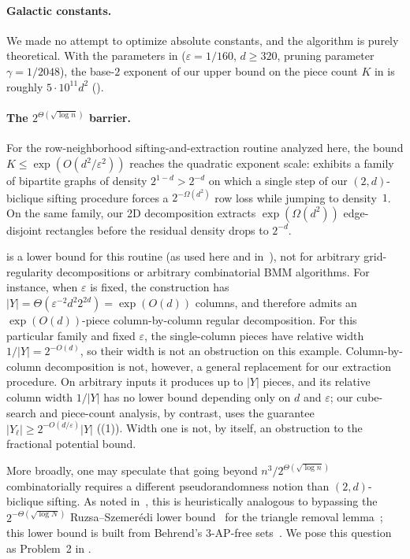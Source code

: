 \documentclass[11pt]{article}
\theoremstyle{definition}
\newcommand{\abs}[1]{\left\lvert #1 \right\rvert}
\begin{document}
\paragraph{Galactic constants.}
We made no attempt to optimize absolute constants, and the algorithm is purely theoretical. With the parameters in  ($\varepsilon = 1/160$, $d \ge 320$, pruning parameter $\gamma = 1/2048$), the base-$2$ exponent of our upper bound on the piece count $K$ in  is roughly $5 \cdot 10^{11} d^2$ ().

\paragraph{The $2^{\Theta(\sqrt{\log n})}$ barrier.}
For the row-neighborhood sifting-and-extraction routine analyzed here, the bound $K \le \exp(O(d^2 / \varepsilon^2))$ reaches the quadratic exponent scale:  exhibits a family of bipartite graphs of density $2^{1-d} > 2^{-d}$ on which a single step of our $(2, d)$-biclique sifting procedure forces a $2^{-\Omega(d^2)}$ row loss while jumping to density~$1$. On the same family, our 2D decomposition extracts $\exp(\Omega(d^2))$ edge-disjoint rectangles before the residual density drops to $2^{-d}$.

 is a lower bound for this routine (as used here and in~\cite{AFKLM24}), not for arbitrary grid-regularity decompositions or arbitrary combinatorial BMM algorithms. For instance, when $\varepsilon$ is fixed, the construction has $\abs{Y} = \Theta(\varepsilon^{-2} d^2 2^{2d}) = \exp(O(d))$ columns, and therefore admits an $\exp(O(d))$-piece column-by-column regular decomposition. For this particular family and fixed $\varepsilon$, the single-column pieces have relative width $1/\abs{Y} = 2^{-O(d)}$, so their width is not an obstruction on this example. Column-by-column decomposition is not, however, a general replacement for our extraction procedure. On arbitrary inputs it produces up to $\abs{Y}$ pieces, and its relative column width $1/\abs{Y}$ has no lower bound depending only on $d$ and $\varepsilon$; our cube-search and piece-count analysis, by contrast, uses the guarantee $\abs{Y_\ell} \ge 2^{-O(d/\varepsilon)}\abs{Y}$ ((1)). Width one is not, by itself, an obstruction to the fractional potential bound.

More broadly, one may speculate that going beyond $n^3 / 2^{\Theta(\sqrt{\log n})}$ combinatorially requires a different pseudorandomness notion than $(2, d)$-biclique sifting. As noted in~\cite[Section~3.4]{AFKLM24}, this is heuristically analogous to bypassing the $2^{-\Theta(\sqrt{\log N})}$ Ruzsa--Szemer\'edi lower bound~\cite{RuzsaS78} for the triangle removal lemma~\cite{Fox11,Zhao23}; this lower bound is built from Behrend's 3-AP-free sets~\cite{Behrend46}. We pose this question as Problem~2 in .
\end{document}
